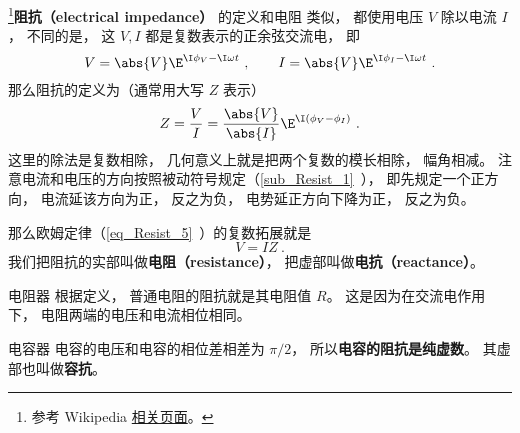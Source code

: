 
\begin{issues}
\issueDraft
\end{issues}


\footnote{参考 Wikipedia \href{https://en.wikipedia.org/wiki/Electrical_impedance}{相关页面}。}\textbf{阻抗（electrical impedance）} 的定义和电阻 类似， 都使用电压 $V$ 除以电流 $I$， 不同的是， 这 $V, I$ 都是复数表示的正余弦交流电， 即
\begin{equation}
V = \abs{V} \E^{\I \phi_V - \I \omega t}~,
\qquad
I = \abs{V} \E^{\I \phi_I - \I \omega t}~.
\end{equation}
那么阻抗的定义为（通常用大写 $Z$ 表示）
\begin{equation}
Z = \frac{V}{I} = \frac{\abs{V}}{\abs{I}} \E^{\I (\phi_V - \phi_I)}~.
\end{equation}
这里的除法是复数相除， 几何意义上就是把两个复数的模长相除， 幅角相减。 注意电流和电压的方向按照被动符号规定（\autoref{sub_Resist_1}~）， 即先规定一个正方向， 电流延该方向为正， 反之为负， 电势延正方向下降为正， 反之为负。

那么欧姆定律（\autoref{eq_Resist_5}~）的复数拓展就是
\begin{equation}
V = IZ~.
\end{equation}
我们把阻抗的实部叫做\textbf{电阻（resistance）}， 把虚部叫做\textbf{电抗（reactance）}。

\begin{example}{电阻器}\label{ex_impeda_1}
根据定义， 普通电阻的阻抗就是其电阻值 $R$。 这是因为在交流电作用下， 电阻两端的电压和电流相位相同。
\end{example}

\begin{example}{电容器}
电容的电压和电容的相位差相差为 $\pi/2$， 所以\textbf{电容的阻抗是纯虚数}。 其虚部也叫做\textbf{容抗}。
\end{example}
